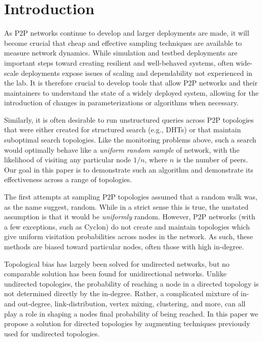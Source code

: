 \section{Introduction}

As P2P networks continue to develop and larger deployments are made, it will
become crucial that cheap and effective sampling techniques are available to
measure network dynamics.  While simulation and testbed deployments are
important steps toward creating resilient and well-behaved systems, often
wide-scale deployments expose issues of scaling and dependability not
experienced in the lab.
It is therefore crucial to develop tools that allow P2P networks and their
maintainers to understand the state of a widely deployed system, allowing for
the introduction of changes in parameterizations or algorithms when necessary.

Similarly, it is often desirable to run unstructured queries across P2P
topologies that were either created for structured search (e.g., DHTs) or that
maintain suboptimal search topologies.  Like the monitoring problems above,
such a search would optimally behave like a \emph{uniform random sample} of
network, with the likelihood of visiting any particular node $1/n$, where $n$
is the number of peers.  Our goal in this paper is to demonstrate such an
algorithm and demonstrate its effectiveness across a range of topologies.

The first attempts at sampling P2P topologies assumed that a random walk was,
as the name suggest, random.  While in a strict sense this is true, the
unstated assumption is that it would be \emph{uniformly} random.  However, P2P
networks (with a few exceptions, such as Cyclon) do not create and maintain
topologies which give uniform visitation probabilities across nodes in the
network.  As such, these methods are biased toward particular nodes, often
those with high in-degree.

Topological bias has largely been solved for undirected networks, but no
comparable solution has been found for unidirectional networks. Unlike
undirected topologies, the probability of reaching a node in a directed
topology is not determined directly by the in-degree.  Rather, a complicated
mixture of in- and out-degree, link-distribution, vertex mixing, clustering,
and more, can all play a role in shaping a nodes final probability of being
reached. In this paper we propose a solution for directed topologies by
augmenting techniques previously used for undirected topologies.

